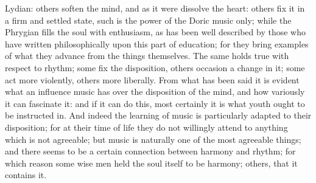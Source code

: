 Lydian: others soften the mind, and as it were dissolve the heart: others
fix it in a firm and settled state, such is the power of the Doric music
only; while the Phrygian fills the soul with enthusiasm, as has been well
described by those who have written philosophically upon this part of
education; for they bring examples of what they advance from the things
themselves. The same holds true with respect to rhythm; some fix the
disposition, others occasion a change in it; some act more violently,
others more liberally. From what has been said it is evident what an
influence music has over the disposition of the mind, and how variously it
can fascinate it: and if it can do this, most certainly it is what youth
ought to be instructed in. And indeed the learning of music is
particularly adapted to their disposition; for at their time of life they
do not willingly attend to anything which is not agreeable; but music is
naturally one of the most agreeable things; and there seems to be a
certain connection between harmony and rhythm; for which reason some wise
men held the soul itself to be harmony; others, that it contains it.


